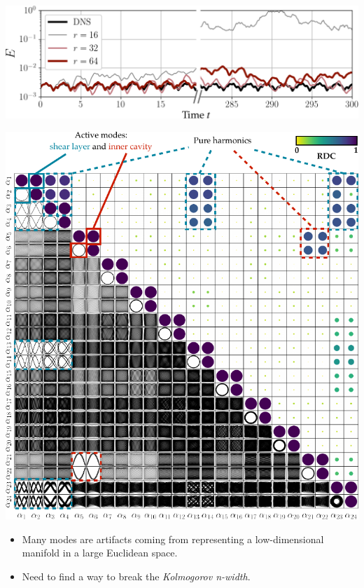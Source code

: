 \documentclass[aspectratio=169,compress,12pt,dvipsnames]{beamer}
\begin{document}
\begin{frame}
    \vfill
    \centering
    \includegraphics[width=\textwidth]{imgs/tke_galerkin.png}
    \vfill
\end{frame}

\begin{frame}
    \vfill
    \begin{minipage}{.48\textwidth}
        \includegraphics[width=\textwidth]{imgs/rdc_score.png}
    \end{minipage}%
    \hfill
    \begin{minipage}{.48\textwidth}
        \begin{itemize}
            \item Many modes are artifacts coming from representing a low-dimensional manifold in a large Euclidean space.
            \par\bigskip
            \item Need to find a way to break the \emph{Kolmogorov n-width}.
        \end{itemize}
    \end{minipage}
    \vfill
\end{frame}
\end{document}
